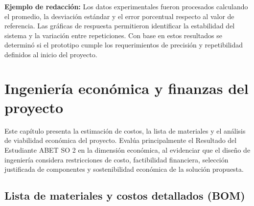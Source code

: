 \documentclass[12pt,letterpaper]{report}
\begin{document}
\begin{instrucciones}
\noindent \textbf{Ejemplo de redacción:} Los datos experimentales fueron procesados calculando el promedio, la desviación estándar y el error porcentual respecto al valor de referencia. Las gráficas de respuesta permitieron identificar la estabilidad del sistema y la variación entre repeticiones. Con base en estos resultados se determinó si el prototipo cumple los requerimientos de precisión y repetibilidad definidos al inicio del proyecto.
\end{instrucciones}


\section{Ingeniería económica y finanzas del proyecto}

\begin{instrucciones}
Este capítulo presenta la estimación de costos, la lista de materiales y el análisis de viabilidad económica del proyecto. Evalúa principalmente el Resultado del Estudiante ABET SO 2 en la dimensión económica, al evidenciar que el diseño de ingeniería considera restricciones de costo, factibilidad financiera, selección justificada de componentes y sostenibilidad económica de la solución propuesta.
\end{instrucciones}

\subsection{Lista de materiales y costos detallados (BOM)}
\end{document}

